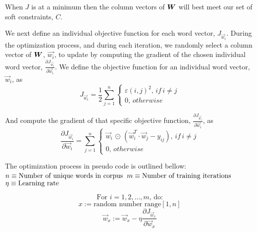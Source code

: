 \documentclass{article}
\begin{document}
When $J$ is at a minimum then the column vectors of $\boldsymbol{W}$ will best meet our set of soft constraints, $C$.

We next define an individual objective function for each word vector, $J_{\vec{w}_{i}}$. During the optimization process, and during each iteration, we randomly select a column vector of $\boldsymbol{W}$, $\vec{w_i}$, to update by computing the gradient of the chosen individual word vector, $\frac{\partial J_{\vec{w}_{i}}}{\partial \vec{w}_{i}}$. We define the objective function for an individual word vector, $\vec{w}_{i}$,  as
\begin{equation*}
J_{\vec{w}_{i}} = \frac{1}{2} \sum_{j=1}^{n} {\begin{cases}
\varepsilon(i,j)^2, \, if \, i \neq j
\\
0, \, otherwise
\end{cases}}
\end{equation*}

And compute the gradient of that specific objective function, $\frac{\partial J_{\vec{w}_{i}}}{\partial \vec{w}_{i}}$, as
\begin{equation*}
\frac{\partial J_{\vec{w}_{i}}}{\partial \vec{w}_{i}} = \sum_{j=1}^{n}{\begin{cases}
\vec{w}_{i} \, \odot \, \left( \vec{w}_{i}^T \cdot \vec{w}_{j} - y_{ij} \right), \, if \, i \neq j
\\
0, \, otherwise
\end{cases}}
\end{equation*}

The optimization process in pseudo code is outlined bellow:
$\\\\ n \equiv \text{Number of unique words in corpus}$
$\\ m \equiv \text{Number of training iterations}$
$\\ \eta \equiv \text{Learning rate}$

\begin{equation*}
\text{For $i = 1,2, \ldots , m$, do:}
\end{equation*}
\begin{equation*}
x := \text{random number range} [1,n]
\end{equation*}
\begin{equation*}
\vec{w}_{x} := \vec{w}_{x} - \eta \frac{\partial J_{\vec{w}_{x}}}{\partial \vec{w}_{x}}
\end{equation*}
\end{document}
